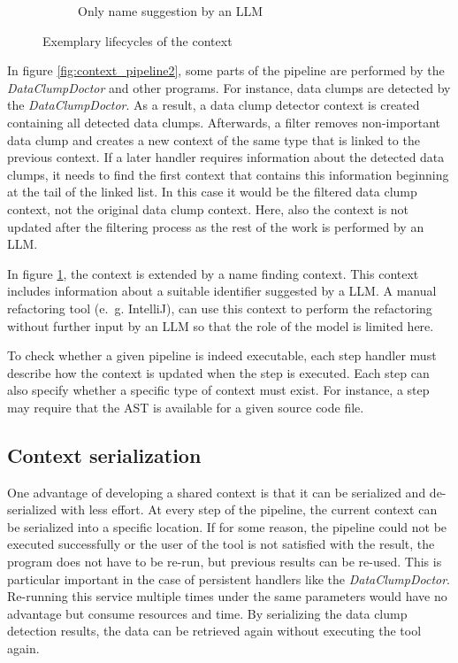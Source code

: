 \begin{figure}[H]
\begin{adjustbox}{minipage=\linewidth,scale=0.7}
\begin{subfigure}[b]{0.3\textwidth}
 \caption{Only name suggestion by an \ac{LLM}}         \label{fig:context_pipeline3}
     \end{subfigure}
        \caption{Exemplary lifecycles of the context}
        \label{fig:context_pipeline}
        \end{adjustbox}
\end{figure}

In figure \ref{fig:context_pipeline2}, some parts of the pipeline are performed by the \textit{DataClumpDoctor} and other programs. For instance, data clumps are detected by the \textit{DataClumpDoctor}. As a result, a data clump detector context is created containing all detected data clumps. Afterwards, a filter removes non-important data clump and creates a new context of the same type that is linked to the previous context. If a later handler requires information about the detected data clumps, it needs to find the first context that contains this information  beginning at the tail of the linked list. In this case it would be the filtered data clump context, not the original data clump context. Here, also the context is not updated after the filtering process as the rest of the work is performed by an \ac{LLM}. 

In figure \ref{fig:context_pipeline3}, the context is extended by a name finding context. This context includes information about a suitable identifier suggested by a \ac{LLM}. A manual refactoring tool (e.~g. IntelliJ), can use this context to perform the refactoring without further input by an \ac{LLM} so that the role of the model is limited here. 




To check whether a given pipeline is indeed executable, each step handler must describe how the context is updated when the step is executed. Each step can also specify whether a specific type of context must exist. For instance, a step may require that the \ac{AST} is available for a given source code file. 


\subsection{Context serialization}\label{sec:context_serialize}

One advantage of developing a shared context is that it can be serialized  and de-serialized with less effort. At every step of the pipeline, the current context can be  serialized into a specific location. If for some reason, the pipeline could not be executed successfully or the user of the tool is not satisfied with the result, the program does not have to be re-run, but previous results can be re-used. This is particular important in the case of persistent handlers like the \textit{DataClumpDoctor}. Re-running this service multiple times under the same parameters would have no advantage but consume resources and time. By serializing the data clump detection results, the data can be retrieved again without executing the tool again.

